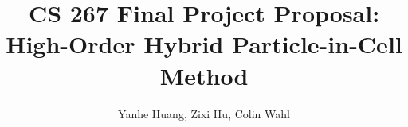 \documentclass[aps,12pt, notitlepage]{revtex4-1}
\renewcommand{\=}[1]{\overline{#1}}
\begin{document}
\title{CS 267 Final Project Proposal:\\
 \large High-Order Hybrid Particle-in-Cell Method}
\author{Yanhe Huang, Zixi Hu, Colin Wahl}

\maketitle


%
%
%
%
\end{document}
